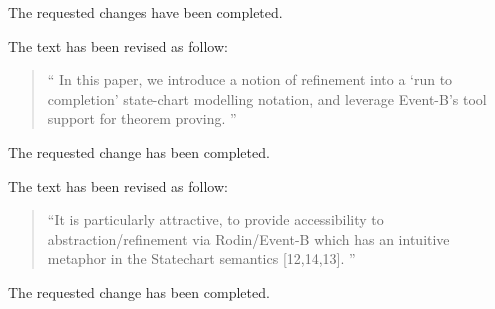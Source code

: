 \documentclass{response}
\begin{document}
\begin{response}
  The requested changes have been completed.
\end{response}


\begin{comment}{Reviewer \#2}
- Abstract: "We introduce" --> "In this paper, we introduce".
\end{comment}

\begin{response}
  The text has been revised as follow:
  \begin{quote}
    `` In this paper, we introduce a notion of refinement into a ‘run to completion’ state-chart 
    modelling notation, and leverage Event-B’s tool support for theorem proving. ''
  \end{quote}
\end{response}


\begin{comment}{Reviewer \#2}
- Add "Even-B" to the list of keywords.
\end{comment}

\begin{response}
  The requested change has been completed.
\end{response}


\begin{comment}{Reviewer \#2}
- Page 2: line 5: "Particularly attractive is providing" --> "Particularly 
attractive in providing"
\end{comment}

\begin{response}
  The text has been revised as follow:
  \begin{quote}
    ``It is particularly attractive, to provide accessibility to abstraction/refinement via Rodin/Event-B 
    which has an intuitive metaphor in the Statechart semantics [12,14,13]. ''
  \end{quote}
\end{response}


\begin{comment}{Reviewer \#2}
- Page 2: line 10: "safety preservation" --> "safety properties preservation"
\end{comment}

\begin{response}
  The requested change has been completed.
\end{response}


\begin{comment}{Reviewer \#2}
- Page 2: line 20: "Preservation of safety" --> "Preservation of safety 
properties"
\end{comment}
\end{document}
